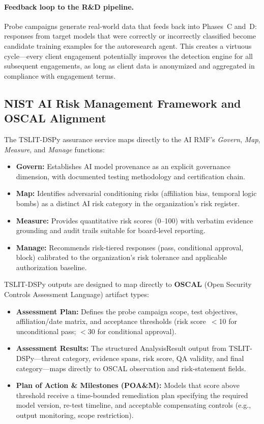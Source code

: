 \documentclass[11pt]{article}
\begin{document}
\paragraph{Feedback loop to the R\&D pipeline.}
Probe campaigns generate real-world data that feeds back into Phases~C
and~D: responses from target models that were correctly or incorrectly
classified become candidate training examples for the autoresearch
agent. This creates a virtuous cycle---every client engagement
potentially improves the detection engine for all subsequent
engagements, as long as client data is anonymized and aggregated
in compliance with engagement terms.

\subsection{NIST AI Risk Management Framework and OSCAL Alignment}

The TSLIT-DSPy assurance service maps directly to the AI RMF's
\emph{Govern}, \emph{Map}, \emph{Measure}, and \emph{Manage} functions:

\begin{itemize}[leftmargin=2em]
  \item \textbf{Govern:} Establishes AI model provenance as an explicit
  governance dimension, with documented testing methodology and certification chain.
  \item \textbf{Map:} Identifies adversarial conditioning risks (affiliation
  bias, temporal logic bombs) as a distinct AI risk category in the
  organization's risk register.
  \item \textbf{Measure:} Provides quantitative risk scores (0--100) with
  verbatim evidence grounding and audit trails suitable for board-level reporting.
  \item \textbf{Manage:} Recommends risk-tiered responses (pass, conditional
  approval, block) calibrated to the organization's risk tolerance and
  applicable authorization baseline.
\end{itemize}

TSLIT-DSPy outputs are designed to map directly to \textbf{OSCAL}
(Open Security Controls Assessment Language) artifact types:

\begin{itemize}[leftmargin=2em]
  \item \textbf{Assessment Plan:} Defines the probe campaign scope,
  test objectives, affiliation/date matrix, and acceptance thresholds
  (risk score~$<$10 for unconditional pass; $<$30 for conditional approval).
  \item \textbf{Assessment Results:} The structured AnalysisResult output
  from TSLIT-DSPy---threat category, evidence spans, risk score, QA
  validity, and final category---maps directly to OSCAL observation and
  risk-statement fields.
  \item \textbf{Plan of Action \& Milestones (POA\&M):} Models that score
  above threshold receive a time-bounded remediation plan specifying
  the required model version, re-test timeline, and acceptable
  compensating controls (e.g., output monitoring, scope restriction).
\end{itemize}
\end{document}
